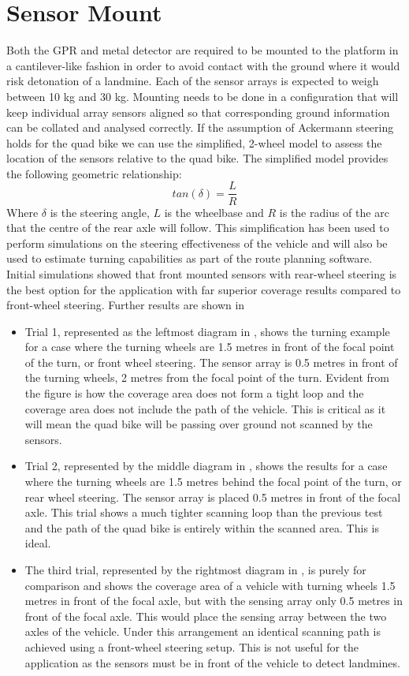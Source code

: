 \documentclass[main.tex]{subfiles}
\begin{document}
\section{Sensor Mount}
Both the GPR and metal detector are required to be mounted to the platform in a cantilever-like fashion in order to avoid contact with the ground where it would risk detonation of a landmine. Each of the sensor arrays is expected to weigh between 10 kg and 30 kg.
Mounting needs to be done in a configuration that will keep individual array sensors aligned so that corresponding ground information can be collated and analysed correctly. If the assumption of Ackermann steering holds for the quad bike we can use the simplified, 2-wheel model to assess the location of the sensors relative to the quad bike. The simplified model provides the following geometric relationship:
$$
tan(\delta) = \frac{L}{R}
$$
Where $\delta$ is the steering angle, $L$ is the wheelbase and $R$ is the radius of the arc that the centre of the rear axle will follow. This simplification has been used to perform simulations on the steering effectiveness of the vehicle and will also be used to estimate turning capabilities as part of the route planning software.
Initial simulations showed that front mounted sensors with rear-wheel steering is the best option for the application with far superior coverage results compared to front-wheel steering. Further results are shown in 
\begin{itemize}
\item Trial 1, represented as the leftmost diagram in , shows the turning example for a case where the turning wheels are 1.5 metres in front of the focal point of the turn, or front wheel steering. The sensor array is 0.5 metres in front of the turning wheels, 2 metres from the focal point of the turn. Evident from the figure is how the coverage area does not form a tight loop and the coverage area does not include the path of the vehicle. This is critical as it will mean the quad bike will be passing over ground not scanned by the sensors.
\item Trial 2, represented by the middle diagram in , shows the results for a case where the turning wheels are 1.5 metres behind the focal point of the turn, or rear wheel steering. The sensor array is placed 0.5 metres in front of the focal axle. This trial shows a much tighter scanning loop than the previous test and the path of the quad bike is entirely within the scanned area. This is ideal.
\item The third trial, represented by the rightmost diagram in , is purely for comparison and shows the coverage area of a vehicle with turning wheels 1.5 metres in front of the focal axle, but with the sensing array only 0.5 metres in front of the focal axle. This would place the sensing array between the two axles of the vehicle. Under this arrangement an identical scanning path is achieved using a front-wheel steering setup. This is not useful for the application as the sensors must be in front of the vehicle to detect landmines.
\end{itemize}
\end{document}
